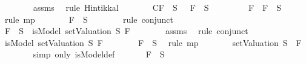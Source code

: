 \begin{isabellebody}
\ \ \ \ \ \ \isamarkupfalse%
\ assms{\isacharparenleft}{}{\isacharparenright}\ \isamarkupfalse%
\ {\isacharparenleft}rule\ Hintikka{\isacharunderscore}l{}{\isacharparenright}\isanewline
\ \ \ \ \isamarkupfalse%
\ \isamarkupfalse%
\ C{\isacharcolon}{\isachardoublequoteopen}F{}\ {\isasymin}\ S\ {\isasymand}\ \isactrlbold {\isasymnot}\ F{}\ {\isasymin}\ S{\isachardoublequoteclose}\isanewline
\ \ \ \ \ \ \isamarkupfalse%
\ {\isacartoucheopen}\isactrlbold {\isasymnot}\ {\isacharparenleft}F{}\ \isactrlbold {\isasymrightarrow}\ F{}{\isacharparenright}\ {\isasymin}\ S{\isacartoucheclose}\ \isamarkupfalse%
\ {\isacharparenleft}rule\ mp{\isacharparenright}\isanewline
\ \ \ \ \isamarkupfalse%
\ \isamarkupfalse%
\ {\isachardoublequoteopen}F{}\ {\isasymin}\ S{\isachardoublequoteclose}\isanewline
\ \ \ \ \ \ \isamarkupfalse%
\ {\isacharparenleft}rule\ conjunct{}{\isacharparenright}\isanewline
\ \ \ \ \isamarkupfalse%
\ {\isachardoublequoteopen}F{}\ {\isasymin}\ S\ {\isasymlongrightarrow}\ isModel\ {\isacharparenleft}setValuation\ S{\isacharparenright}\ F{}{\isachardoublequoteclose}\isanewline
\ \ \ \ \ \ \isamarkupfalse%
\ assms{\isacharparenleft}{}{\isacharparenright}\ \isamarkupfalse%
\ {\isacharparenleft}rule\ conjunct{}{\isacharparenright}\isanewline
\ \ \ \ \isamarkupfalse%
\ \isamarkupfalse%
\ {\isachardoublequoteopen}isModel\ {\isacharparenleft}setValuation\ S{\isacharparenright}\ F{}{\isachardoublequoteclose}\isanewline
\ \ \ \ \ \ \isamarkupfalse%
\ {\isacartoucheopen}F{}\ {\isasymin}\ S{\isacartoucheclose}\ \isamarkupfalse%
\ {\isacharparenleft}rule\ mp{\isacharparenright}\isanewline
\ \ \ \ \isamarkupfalse%
\ \isamarkupfalse%
\ {\isachardoublequoteopen}{\isacharparenleft}setValuation\ S{\isacharparenright}\ {\isasymTurnstile}\ F{}{\isachardoublequoteclose}\isanewline
\ \ \ \ \ \ \isamarkupfalse%
\ {\isacharparenleft}simp\ only{\isacharcolon}\ isModel{\isacharunderscore}def{\isacharparenright}\isanewline
\ \ \ \ \isamarkupfalse%
\ {\isachardoublequoteopen}\isactrlbold {\isasymnot}\ F{}\ {\isasymin}\ S{\isachardoublequoteclose}\isanewline
\ \ \ \ \ \ \isamarkupfalse%

\end{isabellebody}
